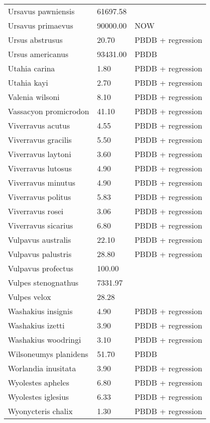 \documentclass{article}
\begin{document}
\begin{center}
\begin{longtable}{p{} p{} p{}}
    Ursavus pawniensis & 61697.58 & \cite{Tomiya2013} \\ 
    Ursavus primaevus & 90000.00 & NOW \\ 
    Ursus abstrusus & 20.70 & PBDB + regression \\ 
    Ursus americanus & 93431.00 & PBDB \\ 
    Utahia carina & 1.80 & PBDB + regression \\ 
    Utahia kayi & 2.70 & PBDB + regression \\ 
    Valenia wilsoni & 8.10 & PBDB + regression \\ 
    Vassacyon promicrodon & 41.10 & PBDB + regression \\ 
    Viverravus acutus & 4.55 & PBDB + regression \\ 
    Viverravus gracilis & 5.50 & PBDB + regression \\ 
    Viverravus laytoni & 3.60 & PBDB + regression \\ 
    Viverravus lutosus & 4.90 & PBDB + regression \\ 
    Viverravus minutus & 4.90 & PBDB + regression \\ 
    Viverravus politus & 5.83 & PBDB + regression \\ 
    Viverravus rosei & 3.06 & PBDB + regression \\ 
    Viverravus sicarius & 6.80 & PBDB + regression \\ 
    Vulpavus australis & 22.10 & PBDB + regression \\ 
    Vulpavus palustris & 28.80 & PBDB + regression \\ 
    Vulpavus profectus & 100.00 & \cite{Williamson2013} \\ 
    Vulpes stenognathus & 7331.97 & \cite{Tomiya2013} \\ 
    Vulpes velox & 28.28 & \cite{Smith2004} \\ 
    Washakius insignis & 4.90 & PBDB + regression \\ 
    Washakius izetti & 3.90 & PBDB + regression \\ 
    Washakius woodringi & 3.10 & PBDB + regression \\ 
    Wilsoneumys planidens & 51.70 & PBDB \\ 
    Worlandia inusitata & 3.90 & PBDB + regression \\ 
    Wyolestes apheles & 6.80 & PBDB + regression \\ 
    Wyolestes iglesius & 6.33 & PBDB + regression \\ 
    Wyonycteris chalix & 1.30 & PBDB + regression \\ 

\end{longtable}
\end{center}
\end{document}
